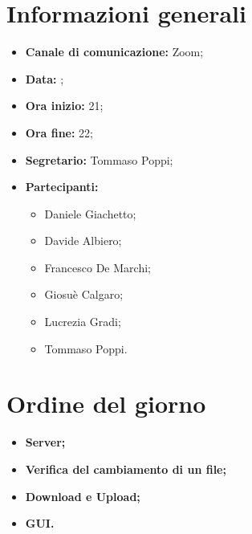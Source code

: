 \section{Informazioni generali}

\begin{itemize}

	\item \textbf{Canale di comunicazione:} Zoom;
	
	\item \textbf{Data:} \DataMeeting{};
	
	\item \textbf{Ora inizio:} 21;
	
	\item \textbf{Ora fine:} 22;
	
	\item \textbf{Segretario:} Tommaso Poppi;
	
	\item \textbf{Partecipanti:}
	
		\begin{itemize}

			\item Daniele Giachetto;
			\item Davide Albiero;
			\item Francesco De Marchi;
			\item Giosuè Calgaro;
			\item Lucrezia Gradi;
			\item Tommaso Poppi.

		\end{itemize}

\end{itemize}



\section{Ordine del giorno}

\begin{itemize}

	\item\textbf{Server;}
	
	\item\textbf{Verifica del cambiamento di un file;}
	
	\item\textbf{Download e Upload;}
	
	\item\textbf{GUI.}

\end{itemize}


